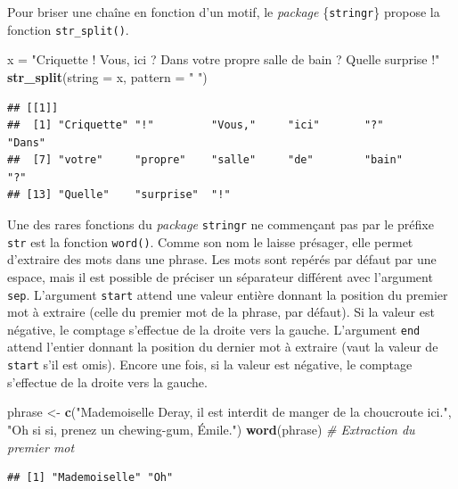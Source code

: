 \documentclass[
  11pt,
]{book}
\newenvironment{Shaded}{\begin{snugshade}}{\end{snugshade}}
\newcommand{\CommentTok}[1]{\textcolor[rgb]{0.56,0.35,0.01}{\textit{#1}}}
\newcommand{\DataTypeTok}[1]{\textcolor[rgb]{0.13,0.29,0.53}{#1}}
\newcommand{\KeywordTok}[1]{\textcolor[rgb]{0.13,0.29,0.53}{\textbf{#1}}}
\newcommand{\NormalTok}[1]{#1}
\newcommand{\StringTok}[1]{\textcolor[rgb]{0.31,0.60,0.02}{#1}}
\numberwithin{equation}{section}
\numberwithin{countremarque}{section}
\begin{document}
Pour briser une chaîne en fonction d'un motif, le \emph{package} \{\texttt{stringr}\} propose la fonction \texttt{str\_split()}.

\begin{Shaded}
\begin{Highlighting}[]
\NormalTok{x =}\StringTok{ "Criquette ! Vous, ici ? Dans votre propre salle de bain ? Quelle surprise !"}
\KeywordTok{str\_split}\NormalTok{(}\DataTypeTok{string =}\NormalTok{ x, }\DataTypeTok{pattern =} \StringTok{" "}\NormalTok{)}
\end{Highlighting}
\end{Shaded}

\begin{lstlisting}
## [[1]]
##  [1] "Criquette" "!"         "Vous,"     "ici"       "?"         "Dans"     
##  [7] "votre"     "propre"    "salle"     "de"        "bain"      "?"        
## [13] "Quelle"    "surprise"  "!"
\end{lstlisting}

Une des rares fonctions du \emph{package} \texttt{stringr} ne commençant pas par le préfixe \texttt{str} est la fonction \texttt{word()}. Comme son nom le laisse présager, elle permet d'extraire des mots dans une phrase. Les mots sont repérés par défaut par une espace, mais il est possible de préciser un séparateur différent avec l'argument \texttt{sep}. L'argument \texttt{start} attend une valeur entière donnant la position du premier mot à extraire (celle du premier mot de la phrase, par défaut). Si la valeur est négative, le comptage s'effectue de la droite vers la gauche. L'argument \texttt{end} attend l'entier donnant la position du dernier mot à extraire (vaut la valeur de \texttt{start} s'il est omis). Encore une fois, si la valeur est négative, le comptage s'effectue de la droite vers la gauche.

\begin{Shaded}
\begin{Highlighting}[]
\NormalTok{phrase \textless{}{-}}\StringTok{ }\KeywordTok{c}\NormalTok{(}\StringTok{"Mademoiselle Deray, il est interdit de manger de la choucroute ici."}\NormalTok{,}
            \StringTok{"Oh si si, prenez un chewing{-}gum, Émile."}\NormalTok{)}
\KeywordTok{word}\NormalTok{(phrase) }\CommentTok{\# Extraction du premier mot}
\end{Highlighting}
\end{Shaded}

\begin{lstlisting}
## [1] "Mademoiselle" "Oh"
\end{lstlisting}
\end{document}
